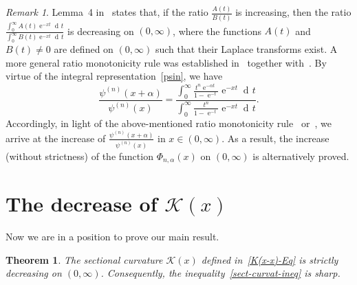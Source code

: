 \documentclass[reqno]{amsart}%
\theoremstyle{plain}
\newtheorem{thm}{Theorem}
\theoremstyle{remark}
\newtheorem{rem}{Remark}
\DeclareMathOperator{\td}{d\!}
\DeclareMathOperator{\te}{e}
\begin{document}
\begin{rem}
Lemma~4 in~\cite{Yang-Tian-JIA-2017} states that, if the ratio $\frac{A(t)}{B(t)}$ is increasing, then the ratio $\frac{\int_{0}^{\infty}A(t)\te^{-xt}\td t}{\int_{0}^{\infty}B(t)\te^{-xt}\td t}$ is decreasing on $(0,\infty)$, where the functions $A(t)$ and $B(t)\ne0$ are defined on $(0,\infty)$ such that their Laplace transforms exist. A more general ratio monotonicity rule was established in~\cite[Lemma~9 and Remark~15]{Alice-y-x-conj-one.tex} together with~\cite[Remark~7.2]{Ouimet-LCM-BKMS.tex}. By virtue of the integral representation~\eqref{psin}, we have
\begin{equation*}
\frac{\psi^{(n)}(x+\alpha)}{\psi^{(n)}(x)}=\frac{\int_{0}^{\infty}\frac{t^n\te^{-\alpha t}}{1-\te^{-t}}\te^{-xt}\td t} {\int_{0}^{\infty}\frac{t^n}{1-\te^{-t}}\te^{-xt}\td t}.
\end{equation*}
Accordingly, in light of the above-mentioned ratio monotonicity rule~\cite[Lemma~9]{Alice-y-x-conj-one.tex} or~\cite[Lemma~4]{Yang-Tian-JIA-2017}, we arrive at the increase of $\frac{\psi^{(n)}(x+\alpha)}{\psi^{(n)}(x)}$ in $x\in(0,\infty)$. As a result, the increase (without strictness) of the function $\Phi_{n,\alpha}(x)$ on $(0,\infty)$ is alternatively proved.
\end{rem}

\section{The decrease of $\mathcal{K}(x)$}
Now we are in a position to prove our main result.

\begin{thm}\label{sect-curvat-decr-thm}
The sectional curvature $\mathcal{K}(x)$ defined in~\eqref{K(x-x)-Eq} is strictly decreasing on $(0,\infty)$. Consequently, the inequality~\eqref{sect-curvat-ineq} is sharp.
\end{thm}
\end{document}
